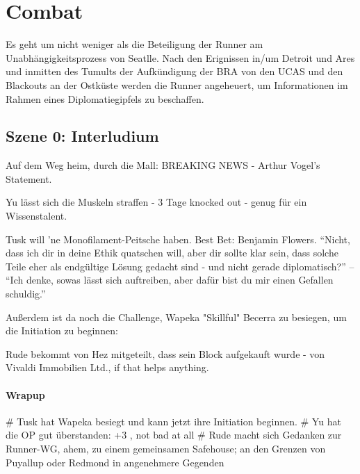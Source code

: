 \chapter{Combat} \label{combat}

Es geht um nicht weniger als die Beteiligung der Runner am Unabhängigkeitsprozess von Seatlle. Nach den Erignissen in/um Detroit und Ares und inmitten des Tumults der Aufkündigung der BRA von den UCAS und den Blackouts an der Ostküste werden die Runner angeheuert, um Informationen im Rahmen eines Diplomatiegipfels zu beschaffen.

\section{Szene 0: Interludium}

Auf dem Weg heim, durch die Mall: BREAKING NEWS - Arthur Vogel's Statement.


Yu lässt sich die Muskeln straffen - 3 Tage knocked out - genug für ein Wissenstalent.

Tusk will 'ne Monofilament-Peitsche haben. Best Bet: Benjamin Flowers. ``Nicht, dass ich dir in deine Ethik quatschen will, aber dir sollte klar sein, dass solche Teile eher als endgültige Lösung gedacht sind - und nicht gerade diplomatisch?'' -- ``Ich denke, sowas lässt sich auftreiben, aber dafür bist du mir einen Gefallen schuldig.''

Außerdem ist da noch die Challenge, Wapeka "Skillful" Becerra zu besiegen, um die Initiation zu beginnen:


Rude bekommt von Hez mitgeteilt, dass sein Block aufgekauft wurde - von Vivaldi Immobilien Ltd., if that helps anything.

\subsubsection{Wrapup}

\begin{easylist}
    # Tusk hat Wapeka besiegt und kann jetzt ihre Initiation beginnen.
    # Yu hat die OP gut überstanden: +3 , not bad at all
    # Rude macht sich Gedanken zur Runner-WG, ahem, zu einem gemeinsamen Safehouse; an den Grenzen von Puyallup oder Redmond in angenehmere Gegenden
\end{easylist}




